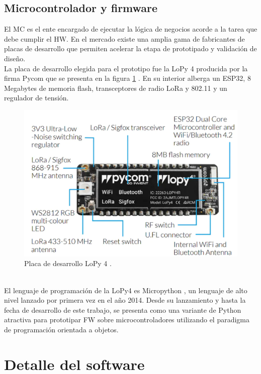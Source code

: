 \subsection{Microcontrolador y firmware}
El MC es el ente encargado de ejecutar la lógica de negocios acorde a la tarea que debe cumplir el HW. En el mercado existe una amplia gama de fabricantes de placas de desarrollo que permiten acelerar la etapa de prototipado y validación de diseño.\\
La placa de desarrollo elegida para el prototipo fue la LoPy 4 producida por la firma Pycom que se presenta en la figura \ref{fig:lopy4} . En su interior alberga un ESP32, 8 Megabytes de memoria flash, transceptores de radio LoRa y 802.11 y un regulador de tensión.\\
\begin{figure}[h]
	\centering
	\includegraphics[width=0.95\linewidth]{Figures/lopy4}
	\caption{Placa de desarrollo LoPy 4 \citep{lopy4}.}
	\label{fig:lopy4}
\end{figure}\\
El lenguaje de programación de la LoPy4 es Micropython \citep{micropy}, un lenguaje de alto nivel lanzado por primera vez en el año 2014. Desde su lanzamiento y hasta la fecha de desarrollo de este trabajo, se presenta como una variante de Python atractiva para prototipar FW sobre microcontroladores utilizando el paradigma de programación orientada a objetos.\\


\section{Detalle del software}
